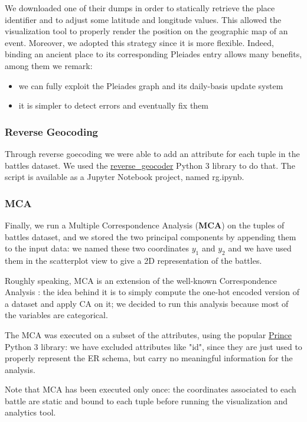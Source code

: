 We downloaded one of their dumps in order to statically retrieve the place identifier and to adjust some latitude and longitude values. This allowed the visualization tool to properly render the position on the geographic map of an event. Moreover, we adopted this strategy since it is more flexible. Indeed, binding an ancient place to its corresponding Pleiades entry allows many benefits, among them we remark:
\begin{itemize}
    \item we can fully exploit the Pleiades graph and its daily-basis update system
    \item it is simpler to detect errors and eventually fix them
\end{itemize}

\subsubsection{Reverse Geocoding}
Through reverse goecoding we were able to add an attribute for each tuple in the battles dataset. We used the \href{https://pypi.org/project/reverse_geocoder/}{reverse\_geocoder} Python 3 library to do that. The script is available as a Jupyter Notebook project, named rg.ipynb.

\subsubsection{MCA}
Finally, we run a Multiple Correspondence Analysis (\textbf{MCA}) \cite{HD07} on the tuples of battles dataset, and we stored the two principal components by appending them to the input data: we named these two coordinates $y_1$ and $y_2$ and we have used them in the scatterplot view to give a 2D representation of the battles.

Roughly speaking, MCA is an extension of the well-known Correspondence Analysis \cite{Hill74}: the idea behind it is to simply compute the one-hot encoded version of a dataset and apply CA on it; we decided to run this analysis because most of the variables are categorical.

The MCA was executed on a subset of the attributes, using the popular \href{https://pypi.org/project/prince}{Prince} Python 3 library: we have excluded attributes like "id", since they are just used to properly represent the ER schema, but carry no meaningful information for the analysis.

Note that MCA has been executed only once: the coordinates associated to each battle are static and bound to each tuple before running the visualization and analytics tool.

